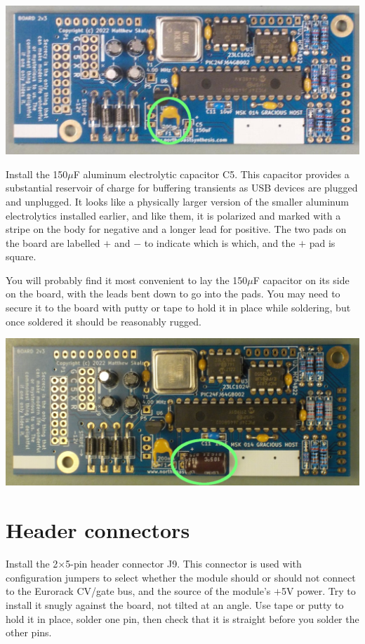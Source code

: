 \nopagebreak
\noindent\includegraphics[width=\linewidth]{polyfuse.jpg}

Install the 150$\mu$F aluminum electrolytic capacitor C5.  This capacitor
provides a substantial reservoir of charge for buffering transients as USB
devices are plugged and unplugged.  It looks like a physically larger
version of the smaller aluminum electrolytics installed earlier, and like
them, it is polarized and marked with a stripe on the body for negative and
a longer lead for positive.  The two pads on the board are labelled $+$ and
$-$ to indicate which is which, and the $+$ pad is square.

You will probably find it most convenient to lay the 150$\mu$F capacitor on
its side on the board, with the leads bent down to go into the pads.  You
may need to secure it to the board with putty or tape to hold it in place
while soldering, but once soldered it should be reasonably rugged.

\nopagebreak
\noindent\includegraphics[width=\linewidth]{cap-150u.jpg}

\section{Header connectors}

Install the 2$\times$5-pin header connector J9.  This connector is used with
configuration jumpers to select whether the module should or should not
connect to the Eurorack CV/gate bus, and the source of the module's $+$5V
power.  Try to install it snugly against the board, not tilted at an angle. 
Use tape or putty to hold it in place, solder one pin, then check that it is
straight before you solder the other pins.

